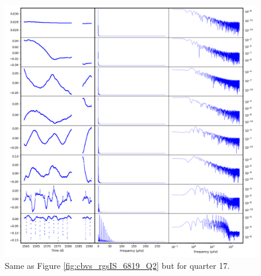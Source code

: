 \begin{figure}
    \centering
    \includegraphics[width=\linewidth]{Chapter_Appended/AppB/cbv_6819_rgs_q17.png}
    \caption{Same as Figure \ref{fig:cbvs_rgsIS_6819_Q2} but for quarter 17.}
    \label{fig:cbvs_rgsIS_6819_Q17}
\end{figure}
